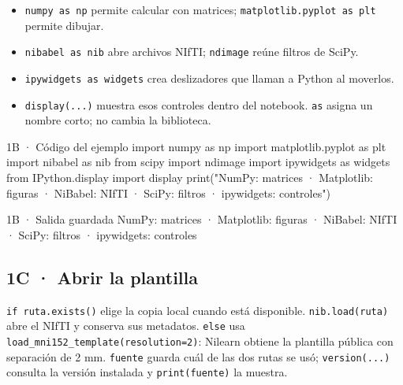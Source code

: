 \label{vivo:1b}

\begin{itemize}[leftmargin=1.4em,itemsep=2pt,topsep=3pt]
\item \texttt{\small numpy as np} permite calcular con matrices; \texttt{\small matplotlib.\allowbreak{}pyplot as plt} permite dibujar.
\item \texttt{\small nibabel as nib} abre archivos NIfTI; \texttt{\small ndimage} reúne filtros de SciPy.
\item \texttt{\small ipywidgets as widgets} crea deslizadores que llaman a Python al moverlos.
\item \texttt{\small display(\allowbreak{}.\allowbreak{}.\allowbreak{}.\allowbreak{})\allowbreak{}} muestra esos controles dentro del notebook. \texttt{\small as} asigna un nombre corto; no cambia la biblioteca.
\end{itemize}

\begin{CodigoVivo}{1B · Código del ejemplo}
import numpy as np
import matplotlib.pyplot as plt
import nibabel as nib
from scipy import ndimage
import ipywidgets as widgets
from IPython.display import display
print("NumPy: matrices · Matplotlib: figuras · NiBabel: NIfTI · SciPy: filtros · ipywidgets: controles")
\end{CodigoVivo}


\begin{Salida}{1B · Salida guardada}
NumPy: matrices · Matplotlib: figuras · NiBabel: NIfTI · SciPy: filtros · ipywidgets: controles
\end{Salida}



\subsection*{1C · Abrir la plantilla}

\label{vivo:1c}

\texttt{\small if ruta.\allowbreak{}exists(\allowbreak{})\allowbreak{}} elige la copia local cuando está disponible. \texttt{\small nib.\allowbreak{}load(\allowbreak{}ruta)\allowbreak{}} abre el NIfTI y conserva sus metadatos. \texttt{\small else} usa \texttt{\small load\_mni152\_template(\allowbreak{}resolution=2)\allowbreak{}}: Nilearn obtiene la plantilla pública con separación de 2 mm. \texttt{\small fuente} guarda cuál de las dos rutas se usó; \texttt{\small version(\allowbreak{}.\allowbreak{}.\allowbreak{}.\allowbreak{})\allowbreak{}} consulta la versión instalada y \texttt{\small print(\allowbreak{}fuente)\allowbreak{}} la muestra.

